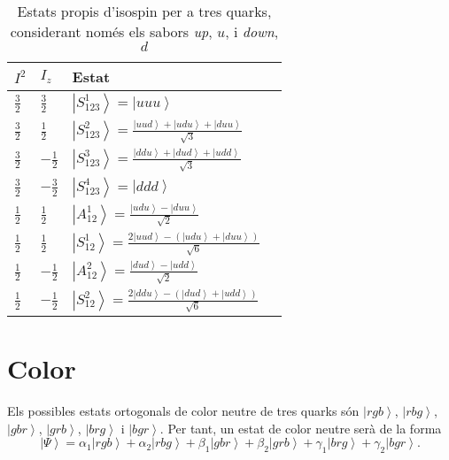 \documentclass[12pt]{article}
\numberwithin{table}{section}
\numberwithin{figure}{section}
\numberwithin{equation}{section}
\newcommand{\ket}[1]{\left\vert {#1} \right\rangle}
\begin{document}
\begin{table}[htb]
	\centering \sffamily \small
	\caption{Estats propis d'isospin per a tres quarks, considerant només els sabors \emph{up}, \( u \), i \emph{down}, \( d \)}
	\label{tab:estats de sabor}
	\begin{tabular}{@{}llll@{}}
		\toprule
		\( I^2 \) & \( I_z \) & Estat \\
		\midrule	
		\( \tfrac{3}{2} \) & \( \tfrac{3}{2} \) & \( \ket{S_{123}^1} = \ket{uuu} \) \\
		\( \tfrac{3}{2} \) & \( \tfrac{1}{2} \) & \( \ket{S_{123}^2} = \frac{\ket{uud} + \ket{udu} + \ket{duu}}{\sqrt{3}} \) \\
		\( \tfrac{3}{2} \) & \( -\tfrac{1}{2} \) & \( \ket{S_{123}^3} = \frac{\ket{ddu} + \ket{dud} + \ket{udd}}{\sqrt{3}} \) \\
		\( \tfrac{3}{2} \) & \( -\tfrac{3}{2} \) & \( \ket{S_{123}^4} = \ket{ddd} \) \\
		\( \tfrac{1}{2} \) & \( \tfrac{1}{2} \) & \( \ket{A_{12}^1} = \frac{\ket{udu} - \ket{duu}}{\sqrt{2}} \) \\
		\( \tfrac{1}{2} \) & \( \tfrac{1}{2} \) & \( \ket{S_{12}^1} = \frac{2\ket{uud} - (\ket{udu} + \ket{duu})}{\sqrt{6}} \) \\
		\( \tfrac{1}{2} \) & \( -\tfrac{1}{2} \) & \( \ket{A_{12}^2} = \frac{\ket{dud} - \ket{udd}}{\sqrt{2}} \) \\
		\( \tfrac{1}{2} \) & \( -\tfrac{1}{2} \) & \( \ket{S_{12}^2} = \frac{2\ket{ddu} - (\ket{dud} + \ket{udd})}{\sqrt{6}} \) \\
		\bottomrule
	\end{tabular}
\end{table}

\section{Color}
Els possibles estats ortogonals de color neutre de tres quarks són \( \ket{rgb} \), \( \ket{rbg} \), \( \ket{gbr} \), \( \ket{grb} \), \( \ket{brg} \) i \( \ket{bgr} \). Per tant, un estat de color neutre serà de la forma
\begin{equation*}
	\ket{\Psi} = \alpha_1 \ket{rgb} + \alpha_2 \ket{rbg} + \beta_1 \ket{gbr} + \beta_2 \ket{grb} + \gamma_1 \ket{brg} + \gamma_2 \ket{bgr}.
\end{equation*}
\end{document}
